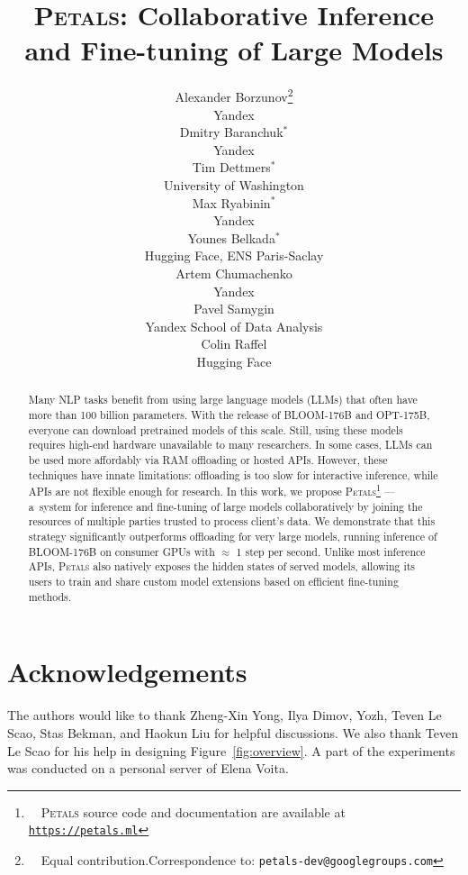 \documentclass[11pt]{article}
\title{\textsc{Petals}: Collaborative Inference and Fine-tuning of Large Models}
\author{Alexander Borzunov\thanks{~~Equal contribution.\newline Correspondence to: \texttt{petals-dev@googlegroups.com}}\\
  Yandex \\\And
  Dmitry Baranchuk$^*$ \\
  Yandex \\\And
  Tim Dettmers$^*$ \\
  University of Washington\\\AND
  Max Ryabinin$^*$ \\
  Yandex \\\And
  Younes Belkada$^*$ \\
  Hugging Face, ENS Paris-Saclay \\\And
  Artem Chumachenko \\
  Yandex \\\AND
  Pavel Samygin \\
  Yandex School of Data Analysis \\\And
  Colin Raffel \\
  Hugging Face
  }
\begin{document}
\maketitle
\begin{abstract}

Many NLP tasks
benefit from using large language models (LLMs) that often have more than 100 billion parameters. With the release of BLOOM-176B and OPT-175B, everyone can download pretrained models of this scale.
Still, using these models requires high-end hardware unavailable to many researchers. 
In some cases, LLMs can be used more affordably via RAM offloading or hosted APIs. However, these techniques have innate limitations: offloading is too slow for interactive inference, while APIs are not flexible enough for research.
In this work, we propose \textsc{Petals}\footnote{~~\textsc{Petals} source code and documentation are available at \texttt{\href{https://petals.ml}{https://petals.ml}}} --- a~system for inference and fine-tuning of large models collaboratively by joining the resources of multiple parties trusted to process client's data.
We demonstrate that this strategy significantly outperforms offloading for very large models, running inference of BLOOM-176B on consumer GPUs with $\approx$ 1 step per second.
Unlike most inference APIs, \textsc{Petals} also natively exposes the hidden states of served models, allowing its users to train and share custom model extensions based on efficient fine-tuning methods.


\end{abstract}









\section*{Acknowledgements}
The authors would like to thank Zheng-Xin Yong, Ilya Dimov, Yozh, Teven Le Scao, Stas Bekman, and Haokun Liu for helpful discussions. We also thank Teven Le Scao for his help in designing Figure~\ref{fig:overview}. A part of the experiments was conducted on a personal server of Elena Voita.






\end{document}
